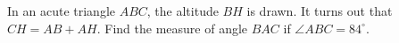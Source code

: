 In an acute triangle $ABC$, the altitude $BH$ is drawn. It turns out that $CH=AB+AH$. Find the measure of angle $BAC$ if $\angle ABC=84^{\circ}$.

